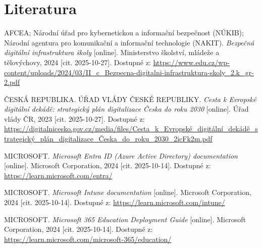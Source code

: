 \documentclass[a4paper]{article}
\begin{document}
\section*{Literatura}
AFCEA; Národní úřad pro kybernetickou a informační bezpečnost (NÚKIB); Národní agentura pro komunikační a informační technologie (NAKIT). \textit{Bezpečná digitální infrastruktura školy} [online]. Ministerstvo školství, mládeže a tělovýchovy, 2024 [cit. 2025-10-27]. Dostupné z: \url{https://www.edu.cz/wp-content/uploads/2024/03/II_c_Bezpecna-digitalni-infrastruktura-skoly_2.k_gr-2.pdf}

\vspace{0.5em}
ČESKÁ REPUBLIKA. ÚŘAD VLÁDY ČESKÉ REPUBLIKY. \textit{Cesta k Evropské digitální dekádě: strategický plán digitalizace Česka do roku 2030} [online]. Úřad vlády ČR, 2023 [cit. 2025-10-27]. Dostupné z: \url{https://digitalnicesko.gov.cz/media/files/Cesta_k_Evropské_digitální_dekádě_strategický_plán_digitalizace_Česka_do_roku_2030_2icFk2m.pdf}

\vspace{0.5em}
MICROSOFT. \textit{Microsoft Entra ID (Azure Active Directory) documentation} [online]. Microsoft Corporation, 2024 [cit. 2025-10-14]. Dostupné z: \url{https://learn.microsoft.com/entra/}

\vspace{0.5em}
MICROSOFT. \textit{Microsoft Intune documentation} [online]. Microsoft Corporation, 2024 [cit. 2025-10-14]. Dostupné z: \url{https://learn.microsoft.com/intune/}

\vspace{0.5em}
MICROSOFT. \textit{Microsoft 365 Education Deployment Guide} [online]. Microsoft Corporation, 2024 [cit. 2025-10-14]. Dostupné z: \url{https://learn.microsoft.com/microsoft-365/education/}
\end{document}
